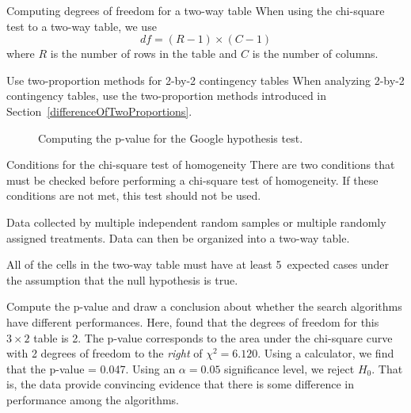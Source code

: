 \begin{onebox}{Computing degrees of freedom for a two-way table}
When using the chi-square test to a two-way table, we use
$$ df = (R-1)\times (C-1) $$
where $R$ is the number of rows in the table and $C$ is the number of columns.\end{onebox}

\begin{onebox}{Use two-proportion methods for 2-by-2 contingency tables}
When analyzing 2-by-2 contingency tables, use the two-proportion methods introduced in Section~\ref{differenceOfTwoProportions}.\end{onebox}

\begin{figure}[h]
\centering
{}
\caption{Computing the p-value for the Google hypothesis test.}
\label{googleHTForDiffAlgPerformancePValue}
\end{figure}

\begin{onebox}{Conditions for the chi-square test of homogeneity}
There are two conditions that must be checked before performing a chi-square test of homogeneity. If these conditions are not met, this test should not be used.\vspace{-1mm}
\begin{description}
\setlength{\itemsep}{0mm}
\item[Multiple random samples or randomly assigned treatments. ]Data collected by multiple independent random samples or multiple randomly assigned treatments. Data can then be organized into a two-way table.
\item[All expected counts at least 5. ] All of the cells in the two-way table must  have at least 5~expected cases under the assumption that the null hypothesis is true.  
\vspace{-1mm}
\end{description}\end{onebox}

\begin{examplewrap}
\begin{nexample}{Compute the p-value and draw a conclusion about whether the search algorithms have different performances.}
Here, found that the degrees of freedom for this $3\times 2$ table is 2.  The p-value corresponds to the area under the chi-square curve with 2 degrees of freedom to the \emph{right} of $\chi^2=6.120$.  Using a calculator, we find that the p-value = 0.047.  Using an $\alpha=0.05$ significance level, we reject $H_0$.  That is, the data provide convincing evidence that there is some difference in performance among the algorithms.
\end{nexample}
\end{examplewrap}

